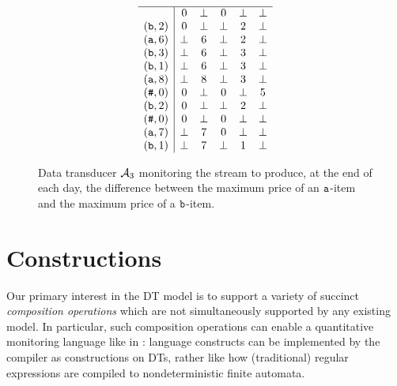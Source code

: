 \begin{figure}[t]
{\begin{minipage}{.5\textwidth}
\[\begin{array}{c|ccccc}
    \hline
    & 0 & \bot & 0 & \bot & \bot \\
    (\texttt{b}, 2) & 0 & \bot & \bot & 2 & \bot \\
    (\texttt{a}, 6) & \bot & 6 & \bot & 2 & \bot \\
    (\texttt{b}, 3) & \bot & 6 & \bot & 3 & \bot \\
    (\texttt{b}, 1) & \bot & 6 & \bot & 3 & \bot \\
    (\texttt{a}, 8) & \bot & 8 & \bot & 3 & \bot \\
    (\texttt{\#}, 0) & 0 & \bot & 0 & \bot & 5 \\
    (\texttt{b}, 2) & 0 & \bot & \bot & 2 & \bot \\
    (\texttt{\#}, 0) & 0 & \bot & 0 & \bot & \bot \\
    (\texttt{a}, 7) & \bot & 7 & 0 & \bot & \bot \\
    (\texttt{b}, 1) & \bot & 7 & \bot & 1 & \bot \\
\end{array}
\]
\end{minipage}}

\caption[Data transducer example 3.]{Data transducer $\mathcal{A}_3$ monitoring the stream to produce, at the end of each day, the difference between the maximum price of an $\texttt{a}$-item and the maximum price of a $\texttt{b}$-item.}
\label{fig:dt-example-parallel}
\end{figure}

\section{Constructions}
\label{dt:sec:constructions}

Our primary interest in the DT model is to support a variety of succinct \emph{composition operations} which are not simultaneously supported by any existing model. In particular, such composition operations can enable a quantitative monitoring language like \QREpast{} in : language constructs can be implemented by the compiler as constructions on DTs, rather like how (traditional) regular expressions are compiled to nondeterministic finite automata.

